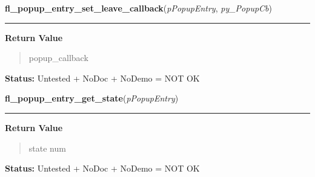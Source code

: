     \vspace{0.5ex}

\hspace{.8\funcindent}\begin{boxedminipage}{\funcwidth}

    \raggedright \textbf{fl\_popup\_entry\_set\_leave\_callback}(\textit{pPopupEntry}, \textit{py\_PopupCb})

    \vspace{-1.5ex}

    \rule{\textwidth}{0.5\fboxrule}
\setlength{\parskip}{2ex}
\setlength{\parskip}{1ex}
      \textbf{Return Value}
    \vspace{-1ex}

      \begin{quote}
      popup\_callback

      \end{quote}

\textbf{Status:} Untested + NoDoc + NoDemo = NOT OK



    \end{boxedminipage}

    \label{xformslib:flpopup:fl_popup_entry_get_state}

    \vspace{0.5ex}

\hspace{.8\funcindent}\begin{boxedminipage}{\funcwidth}

    \raggedright \textbf{fl\_popup\_entry\_get\_state}(\textit{pPopupEntry})

    \vspace{-1.5ex}

    \rule{\textwidth}{0.5\fboxrule}
\setlength{\parskip}{2ex}
\setlength{\parskip}{1ex}
      \textbf{Return Value}
    \vspace{-1ex}

      \begin{quote}
      state num

      \end{quote}

\textbf{Status:} Untested + NoDoc + NoDemo = NOT OK



    \end{boxedminipage}

